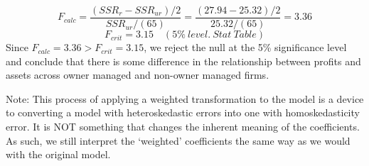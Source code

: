 \documentclass[12pt]{report}
\begin{document}
$$F_{calc} = \dfrac{(SSR_r - SSR_{ur})/2}{SSR_{ur}/(65)} = \dfrac{(27.94-25.32)/2}{25.32/(65)} = 3.36$$
$$F_{crit} = 3.15 \quad (5\%\ level.\ Stat\ Table)$$
\noindent Since $F_{calc}=3.36 > F_{crit}=3.15$, we reject the null at the 5\% significance level and conclude that there is some difference in the relationship between profits and assets across owner managed and non-owner managed firms.

\noindent Note: This process of applying a weighted transformation to the model is a device to converting a model with heteroskedastic errors into one with homoskedasticity error. It is NOT something that changes the inherent meaning of the coefficients. As such, we still interpret the ‘weighted’ coefficients the same way as we would with the original model.
\end{document}
